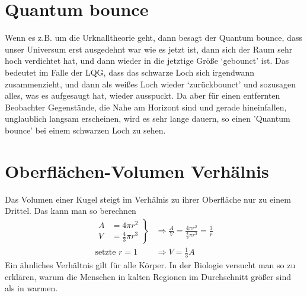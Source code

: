 \documentclass[ngerman]{scrartcl}
\begin{document}
\section{Quantum bounce} \label{QuantumBounce}
	Wenn es z.B. um die Urknalltheorie geht, dann besagt der Quantum bounce, dass unser Universum erst ausgedehnt war wie es jetzt ist, dann sich der Raum sehr hoch verdichtet hat, und dann wieder in die jetztige Größe `gebounct' ist. Das bedeutet im Falle der LQG, dass das schwarze Loch sich irgendwann zusammenzieht, und dann als weißes Loch wieder `zurückbounct' und sozusagen alles, was es aufgesaugt hat, wieder ausspuckt. Da aber für einen entfernten Beobachter Gegenstände, die Nahe am Horizont sind und gerade hineinfallen, unglaublich langsam erscheinen, wird es sehr lange dauern, so einen 'Quantum bounce' bei einem schwarzen Loch zu sehen.  

\section{Oberflächen-Volumen Verhälnis} \label{O/V-Verhaeltnis}
	Das Volumen einer Kugel steigt im Verhälnis zu ihrer Oberfläche nur zu einem Drittel.
	Das kann man so berechnen
		\begin{align*}
			\left.
			\begin{aligned}
			A &= 4 \pi r^2 \\
			V &= \frac{4}{3} \pi r^3 
			\end{aligned}
			\right\}
			&\Rightarrow 
			\frac{A}{V} = \frac{4 \pi r^2}{\frac{4}{3} \pi r^3} = \frac{3}{r} \\
			\text{setzte }r = 1 &\Rightarrow V = \frac{1}{3} A			
		\end{align*}
	Ein ähnliches Verhältnis gilt für alle Körper. In der Biologie versucht man so zu erklären, warum die Menschen in kalten Regionen im Durchschnitt größer sind als in warmen. 
\newpage
\printbibliography
\end{document}
